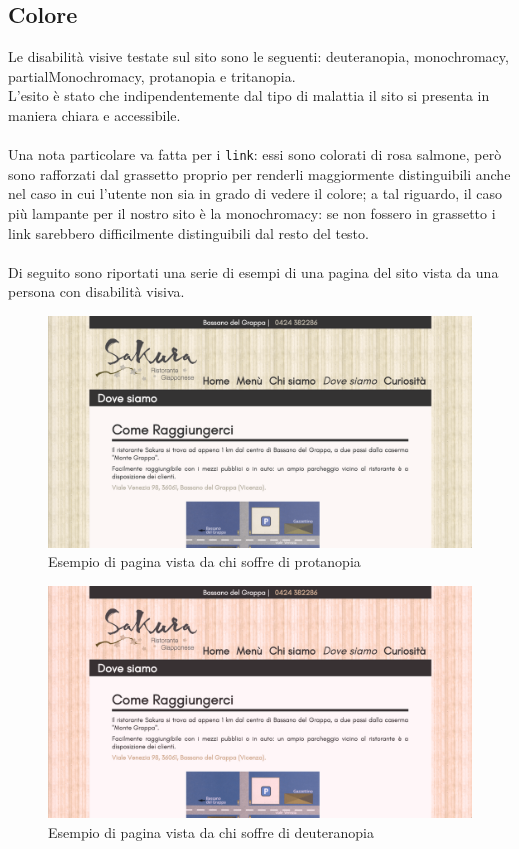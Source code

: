 \documentclass[../relazione.tex]{subfiles}
\begin{document}
	\subsection{Colore}
		Le disabilità visive testate sul sito sono le seguenti: deuteranopia, monochromacy, partialMonochromacy, protanopia e tritanopia.\\
		L'esito è stato che indipendentemente dal tipo di malattia il sito si presenta in maniera chiara e accessibile.\\\\
		Una nota particolare va fatta per i \texttt{link}: essi sono colorati di rosa salmone, però sono rafforzati dal grassetto proprio per renderli maggiormente distinguibili anche nel caso in cui l'utente non sia in grado di vedere il colore; a tal riguardo, il caso più lampante per il nostro sito è la monochromacy: se non fossero in grassetto i link sarebbero difficilmente distinguibili dal resto del testo.\\\\
		Di seguito sono riportati una serie di esempi di una pagina del sito vista da una persona con disabilità visiva.
	\begin{figure}[H]
	\centering
		\includegraphics[width=\textwidth]{images/colorblindness/protanopia}
		\caption{Esempio di pagina vista da chi soffre di protanopia}
		\label{fig:Esempio di pagina vista da chi soffre di protanopia}
	\end{figure}
	\begin{figure}[H]
	\centering
		\includegraphics[width=\textwidth]{images/colorblindness/deuteranopia}
		\caption{Esempio di pagina vista da chi soffre di deuteranopia}
		\label{fig:Esempio di pagina vista da chi soffre di deuteranopia}
	\end{figure}
\end{document}
